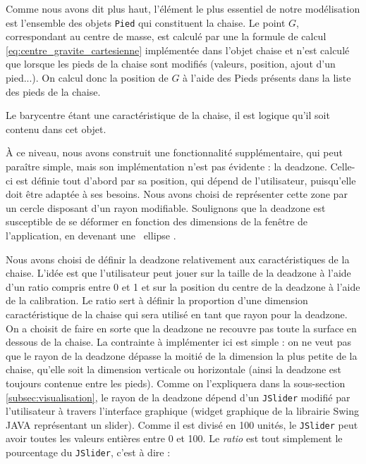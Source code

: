 \documentclass{polytech/polytech}
\begin{document}
Comme nous avons dit plus haut, l'élément le plus essentiel de notre modélisation est l'ensemble des objets \texttt{Pied} qui constituent la chaise.
Le point $G$, correspondant au centre de masse, est calculé par une la formule de calcul \eqref{eq:centre_gravite_cartesienne} implémentée dans l'objet chaise et n'est calculé que lorsque les pieds de la chaise sont modifiés (valeurs, position, ajout d'un pied...). On calcul donc la position de $G$ à l'aide des Pieds présents dans la liste des pieds de la chaise.

Le barycentre étant une caractéristique de la chaise, il est logique qu'il soit contenu dans cet objet.

À ce niveau, nous avons construit une fonctionnalité supplémentaire, qui peut paraître simple, mais son implémentation n'est pas évidente : la deadzone.
Celle-ci est définie tout d'abord par sa position, qui dépend de l'utilisateur, puisqu'elle doit être adaptée à ses besoins.
Nous avons choisi de représenter cette zone par un cercle disposant d'un rayon modifiable.
Soulignons que la deadzone est susceptible de se déformer en fonction des dimensions de la fenêtre de l'application, en devenant une \guillemotleft\ ellipse \guillemotright .

Nous avons choisi de définir la deadzone relativement aux caractéristiques de la chaise. L'idée est que l'utilisateur peut jouer sur la taille de la deadzone à l'aide d'un ratio compris entre 0 et 1 et sur la position du centre de la deadzone à l'aide de la calibration. 
Le ratio sert à définir la proportion d'une dimension caractéristique de la chaise qui sera utilisé en tant que rayon pour la deadzone. 
On a choisit de faire en sorte que la deadzone ne recouvre pas toute la surface en dessous de la chaise. 
La contrainte à implémenter ici est simple : on ne veut pas que le rayon de la deadzone dépasse la moitié de la dimension la plus petite de la chaise, qu'elle soit la dimension verticale ou horizontale (ainsi la deadzone est toujours contenue entre les pieds).
Comme on l'expliquera dans la sous-section \ref{subsec:visualisation}, le rayon de la deadzone dépend d'un \texttt{JSlider} modifié par l'utilisateur à travers l'interface graphique (widget graphique de la librairie Swing JAVA représentant un slider).
Comme il est divisé en 100 unités, le \texttt{JSlider} peut avoir toutes les valeurs entières entre 0 et 100. Le \textit{ratio} est tout simplement le pourcentage du \texttt{JSlider}, c'est à dire :
\end{document}
